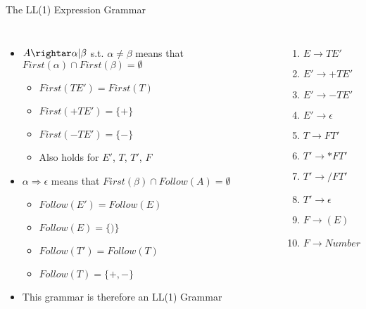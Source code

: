 \documentclass[handout]{beamer}
\newenvironment{code}{%
 \VerbatimEnvironment
 \begin{adjustbox}{max width=\textwidth, max height=0.7\textheight}
 \begin{BVerbatim}
  }{
  \end{BVerbatim}
 \end{adjustbox}
}
\begin{document}
\begin{frame}{The LL(1) Expression Grammar}
\begin{columns}
    \begin{itemize}[<+->]
        \item $A \rightar \alpha | \beta$ s.t. $\alpha \neq \beta$ means that $First(\alpha)\cap First(\beta) = \emptyset$
        \begin{itemize}
            \item $First(TE') = First(T)$
            \item $First(+TE') = \{+\}$
            \item $First(-TE') = \{-\}$
            \item Also holds for $E'$, $T$, $T'$, $F$
        \end{itemize}
        \item $\alpha \Rightarrow \epsilon$ means that $First(\beta)\cap Follow(A)=\emptyset$
        \begin{itemize}
            \item $Follow(E')=Follow(E)$
            \item $Follow(E)=\{)\}$
            \item $Follow(T')=Follow(T)$
            \item $Follow(T)=\{+,-\}$
        \end{itemize}
        \item This grammar is therefore an LL(1) Grammar
    \end{itemize}
\begin{enumerate}
    \item $E \rightarrow TE'$
    \item $E' \rightarrow +TE'$
    \item $E' \rightarrow -TE'$
    \item $E' \rightarrow \epsilon$
    \item $T \rightarrow FT'$
    \item $T' \rightarrow *FT'$
    \item $T' \rightarrow /FT'$
    \item $T' \rightarrow \epsilon$
    \item $F \rightarrow (E)$
    \item $F \rightarrow Number$
\end{enumerate}
\end{columns}
\end{frame}

\end{document}
